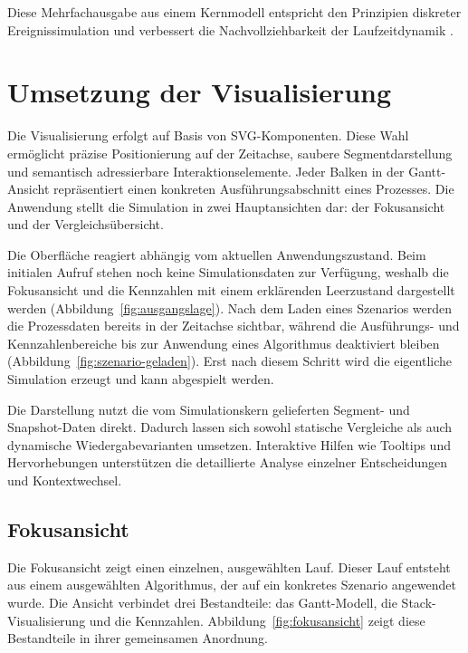 Diese Mehrfachausgabe aus einem Kernmodell entspricht den Prinzipien diskreter Ereignissimulation und verbessert die Nachvollziehbarkeit der Laufzeitdynamik \cite{banks2010discrete}.

\section{Umsetzung der Visualisierung}

Die Visualisierung erfolgt auf Basis von SVG-Komponenten. Diese Wahl ermöglicht präzise Positionierung auf der Zeitachse, saubere Segmentdarstellung und semantisch adressierbare Interaktionselemente. Jeder Balken in der Gantt-Ansicht repräsentiert einen konkreten Ausführungsabschnitt eines Prozesses. Die Anwendung stellt die Simulation in zwei Hauptansichten dar: der Fokusansicht und der Vergleichsübersicht.

Die Oberfläche reagiert abhängig vom aktuellen Anwendungszustand. Beim initialen Aufruf stehen noch keine Simulationsdaten zur Verfügung, weshalb die Fokusansicht und die Kennzahlen mit einem erklärenden Leerzustand dargestellt werden (Abbildung~\ref{fig:ausgangslage}). Nach dem Laden eines Szenarios werden die Prozessdaten bereits in der Zeitachse sichtbar, während die Ausführungs- und Kennzahlenbereiche bis zur Anwendung eines Algorithmus deaktiviert bleiben (Abbildung~\ref{fig:szenario-geladen}). Erst nach diesem Schritt wird die eigentliche Simulation erzeugt und kann abgespielt werden.





Die Darstellung nutzt die vom Simulationskern gelieferten Segment- und Snapshot-Daten direkt. Dadurch lassen sich sowohl statische Vergleiche als auch dynamische Wiedergabevarianten umsetzen. Interaktive Hilfen wie Tooltips und Hervorhebungen unterstützen die detaillierte Analyse einzelner Entscheidungen und Kontextwechsel.

\subsection{Fokusansicht}

Die Fokusansicht zeigt einen einzelnen, ausgewählten Lauf. Dieser Lauf entsteht aus einem ausgewählten Algorithmus, der auf ein konkretes Szenario angewendet wurde. Die Ansicht verbindet drei Bestandteile: das Gantt-Modell, die Stack-Visualisierung und die Kennzahlen. Abbildung~\ref{fig:fokusansicht} zeigt diese Bestandteile in ihrer gemeinsamen Anordnung.


